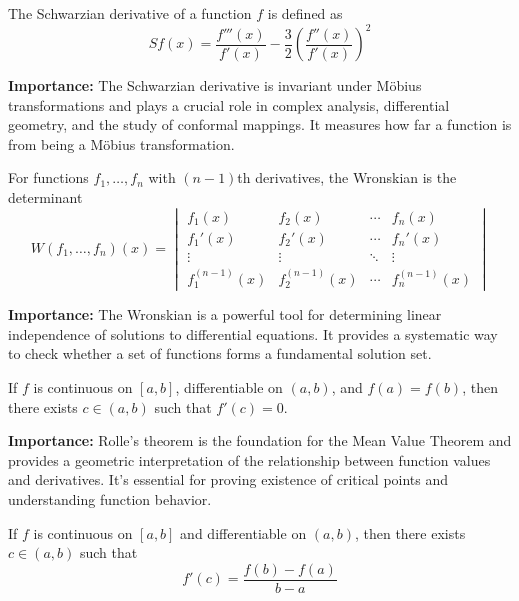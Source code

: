 \begin{theorem}
The Schwarzian derivative of a function $f$ is defined as
\[ Sf(x) = \frac{f'''(x)}{f'(x)} - \frac{3}{2}\left(\frac{f''(x)}{f'(x)}\right)^2 \]
\end{theorem}

\noindent\textbf{Importance:} The Schwarzian derivative is invariant under Möbius transformations and plays a crucial role in complex analysis, differential geometry, and the study of conformal mappings. It measures how far a function is from being a Möbius transformation.



\begin{theorem}[Wronskian]
For functions $f_1, \ldots, f_n$ with $(n-1)$th derivatives, the Wronskian is the determinant
\[ W(f_1, \ldots, f_n)(x) = \begin{vmatrix}
f_1(x) & f_2(x) & \cdots & f_n(x) \\
f_1'(x) & f_2'(x) & \cdots & f_n'(x) \\
\vdots & \vdots & \ddots & \vdots \\
f_1^{(n-1)}(x) & f_2^{(n-1)}(x) & \cdots & f_n^{(n-1)}(x)
\end{vmatrix} \]
\end{theorem}

\noindent\textbf{Importance:} The Wronskian is a powerful tool for determining linear independence of solutions to differential equations. It provides a systematic way to check whether a set of functions forms a fundamental solution set.



\begin{theorem}
If $f$ is continuous on $[a,b]$, differentiable on $(a,b)$, and $f(a) = f(b)$, then there exists $c \in (a,b)$ such that $f'(c) = 0$.
\end{theorem}

\noindent\textbf{Importance:} Rolle's theorem is the foundation for the Mean Value Theorem and provides a geometric interpretation of the relationship between function values and derivatives. It's essential for proving existence of critical points and understanding function behavior.



\begin{theorem}
If $f$ is continuous on $[a,b]$ and differentiable on $(a,b)$, then there exists $c \in (a,b)$ such that
\[ f'(c) = \frac{f(b) - f(a)}{b - a} \]
\end{theorem}

